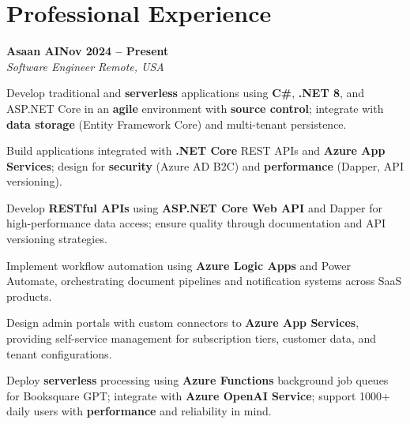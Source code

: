 \documentclass[letterpaper,10pt]{article}
\newcommand{\headingBf}[2]{
  \hspace{10pt}\textbf{#1}\hfill\textbf{#2}\\
}
\newcommand{\headingIt}[2]{
  \hspace{10pt}\textit{#1}\hfill\textit{#2}\\
}
\newenvironment{resume_list}{
  \vspace{-7pt}
  \begin{itemize}[itemsep=-2px, parsep=1pt, leftmargin=30pt]
}{
  \end{itemize}
}
\begin{document}
\section{Professional Experience}

\headingBf{Asaan AI}{Nov 2024 -- Present}
\headingIt{Software Engineer \hfill Remote, USA}{}
\begin{resume_list}
    \item Develop traditional and \textbf{serverless} applications using \textbf{C\#}, \textbf{.NET 8}, and ASP.NET Core in an \textbf{agile} environment with \textbf{source control}; integrate with \textbf{data storage} (Entity Framework Core) and multi-tenant persistence.
    \item Build applications integrated with \textbf{.NET Core} REST APIs and \textbf{Azure App Services}; design for \textbf{security} (Azure AD B2C) and \textbf{performance} (Dapper, API versioning).
    \item Develop \textbf{RESTful APIs} using \textbf{ASP.NET Core Web API} and Dapper for high-performance data access; ensure quality through documentation and API versioning strategies.
    \item Implement workflow automation using \textbf{Azure Logic Apps} and Power Automate, orchestrating document pipelines and notification systems across SaaS products.
    \item Design admin portals with custom connectors to \textbf{Azure App Services}, providing self-service management for subscription tiers, customer data, and tenant configurations.
    \item Deploy \textbf{serverless} processing using \textbf{Azure Functions} background job queues for Booksquare GPT; integrate with \textbf{Azure OpenAI Service}; support 1000+ daily users with \textbf{performance} and reliability in mind.
\end{resume_list}
\end{document}
